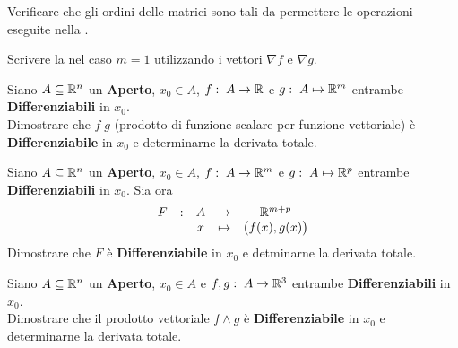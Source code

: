 \begin{exercise}
	Verificare che gli ordini delle matrici sono tali da permettere le operazioni eseguite nella .
\end{exercise}
\begin{exercise}
	Scrivere la  nel caso $m = 1$ utilizzando i vettori $\nabla f$ e $\nabla g$.
\end{exercise}
\begin{exercise}
	Siano $A \subseteq \mathbb{R}^n$ un \textbf{Aperto}, $x_0 \in A$, $f:\; A \to \mathbb{R}$ e $g:\; A \mapsto \mathbb{R}^m$ entrambe \textbf{Differenziabili} in $x_0$.\\
	Dimostrare che $f \; g$ (prodotto di funzione scalare per funzione vettoriale) è \textbf{Differenziabile} in $x_0$ e determinarne la derivata totale.
\end{exercise}
\begin{exercise}
	Siano $A \subseteq \mathbb{R}^n$ un \textbf{Aperto}, $x_0 \in A$, $f:\; A \to \mathbb{R}^m$ e $g:\; A \mapsto \mathbb{R}^p$ entrambe \textbf{Differenziabili} in $x_0$. Sia ora
	\[
		\begin{array}{ccccc} {
			F
		} & : & {
			A
		} & \to & {
			\mathbb{R}^{m + p}
		} \\ & & {
			x
		} & \mapsto & {
			\bigl( f(x), g(x) \bigr)
		} \\ \end{array}
	\]
	Dimostrare che $F$ è \textbf{Differenziabile} in $x_0$ e detminarne la derivata totale.
\end{exercise}
\begin{exercise}
	Siano $A \subseteq \mathbb{R}^n$ un \textbf{Aperto}, $x_0 \in A$ e $f,g:\; A \to \mathbb{R}^3$ entrambe \textbf{Differenziabili} in $x_0$.\\
	Dimostrare che il prodotto vettoriale $f \wedge g$ è \textbf{Differenziabile} in $x_0$ e determinarne la derivata totale.
\end{exercise}

